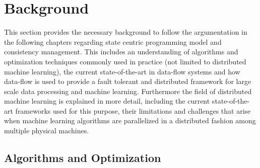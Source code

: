 
\chapter{Background}
\label{c:background}
This section provides the necessary background to follow the argumentation in the following chapters regarding state centric programming model and consistency management.
This includes an understanding of algorithms and optimization techniques commonly used in practice (not limited to distributed machine learning), the current state-of-the-art in data-flow systems and how data-flow is used to provide a fault tolerant and distributed framework for large scale data processing and machine learning.
Furthermore the field of distributed machine learning is explained in more detail, including the current state-of-the-art frameworks used for this purpose, their limitations and challenges that arise when machine learning algorithms are parallelized in a distributed fashion among multiple physical machines.


\section{Algorithms and Optimization}

